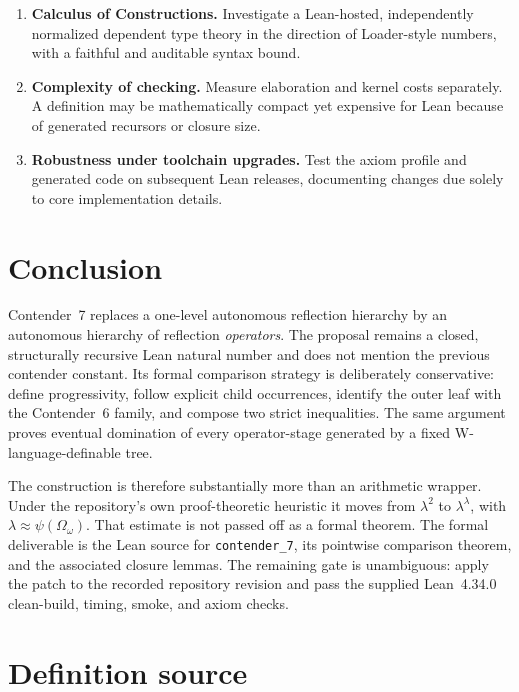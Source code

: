 \documentclass[11pt]{article}
\theoremstyle{definition}
\theoremstyle{remark}
\newcommand{\lean}[1]{\texttt{#1}}
\begin{document}
\begin{enumerate}[leftmargin=*]
  \item \textbf{Calculus of Constructions.}  Investigate a Lean-hosted,
        independently normalized dependent type theory in the direction of
        Loader-style numbers, with a faithful and auditable syntax bound.

  \item \textbf{Complexity of checking.}  Measure elaboration and kernel costs
        separately.  A definition may be mathematically compact yet expensive
        for Lean because of generated recursors or closure size.

  \item \textbf{Robustness under toolchain upgrades.}  Test the axiom profile
        and generated code on subsequent Lean releases, documenting changes
        due solely to core implementation details.
\end{enumerate}

\section{Conclusion}

Contender~7 replaces a one-level autonomous reflection hierarchy by an
autonomous hierarchy of reflection \emph{operators}.  The proposal remains a
closed, structurally recursive Lean natural number and does not mention the
previous contender constant.  Its formal comparison strategy is deliberately
conservative: define progressivity, follow explicit child occurrences, identify
the outer leaf with the Contender~6 family, and compose two strict inequalities.
The same argument proves eventual domination of every operator-stage generated
by a fixed W-language-definable tree.

The construction is therefore substantially more than an arithmetic wrapper.
Under the repository's own proof-theoretic heuristic it moves from
\(\lambda^2\) to \(\lambda^\lambda\), with
\(\lambda\approx\psi(\Omega_\omega)\).  That estimate is not passed off as a
formal theorem.  The formal deliverable is the Lean source for
\lean{contender\_7}, its pointwise comparison theorem, and the associated
closure lemmas.  The remaining gate is unambiguous: apply the patch to the
recorded repository revision and pass the supplied Lean~4.34.0 clean-build,
timing, smoke, and axiom checks.

\appendix
\section{Definition source}
\label{app:definitions}
\end{document}
